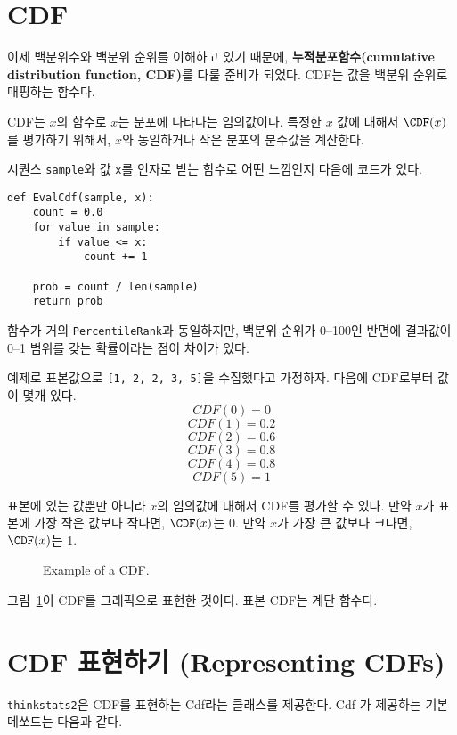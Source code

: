 \section{CDF}

이제 백분위수와 백분위 순위를 이해하고 있기 때문에, {\bf 누적분포함수(cumulative distribution function, CDF)}를 다룰 준비가 되었다. CDF는 값을 백분위 순위로 매핑하는 함수다.

CDF는 $x$의 함수로 $x$는 분포에 나타나는 임의값이다.  
특정한 $x$ 값에 대해서 $\CDF(x)$를 평가하기 위해서, 
$x$와 동일하거나 작은 분포의 분수값을 계산한다.

시퀀스 {\tt sample}와 값 {\tt x}를 인자로 받는 함수로 어떤 느낌인지 다음에 코드가 있다.

%
\begin{verbatim}
def EvalCdf(sample, x):
    count = 0.0
    for value in sample:
        if value <= x:
            count += 1

    prob = count / len(sample)
    return prob
\end{verbatim}

함수가 거의 {\tt PercentileRank}과 동일하지만, 백분위 순위가 0--100인 반면에 결과값이 0--1 범위를 갖는 확률이라는 점이 차이가 있다.

예제로 표본값으로 {\tt [1, 2, 2, 3, 5]}을 수집했다고 가정하자. 다음에 CDF로부터 값이 몇개 있다.
%
\[ CDF(0) = 0 \]
%
\[ CDF(1) = 0.2\]
%
\[ CDF(2) = 0.6\]
%
\[ CDF(3) = 0.8\]
%
\[ CDF(4) = 0.8\]
%
\[ CDF(5) = 1\]
%

표본에 있는 값뿐만 아니라 $x$의 임의값에 대해서 CDF를 평가할 수 있다.
만약 $x$가 표본에 가장 작은 값보다 작다면, $\CDF(x)$는 0.
만약 $x$가 가장 큰 값보다 크다면, $\CDF(x)$는 1.

\begin{figure}
\caption{Example of a CDF.}
\label{example_cdf}
\end{figure}

그림~\ref{example_cdf}이 CDF를 그래픽으로 표현한 것이다.
표본 CDF는 계단 함수다.


\section{CDF 표현하기 (Representing CDFs)}

{\tt thinkstats2}은 CDF를 표현하는 Cdf라는 클래스를 제공한다. Cdf 가 제공하는 기본 메쏘드는 다음과 같다.

